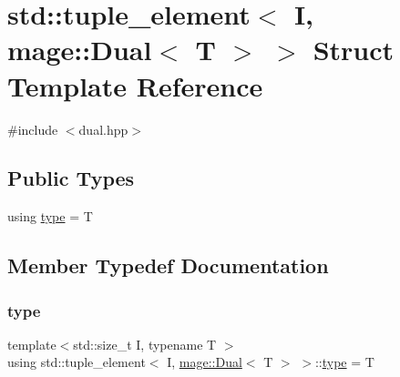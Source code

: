 \hypertarget{structstd_1_1tuple__element_3_01_i_00_01mage_1_1_dual_3_01_t_01_4_01_4}{}\section{std\+:\+:tuple\+\_\+element$<$ I, mage\+:\+:Dual$<$ T $>$ $>$ Struct Template Reference}
\label{structstd_1_1tuple__element_3_01_i_00_01mage_1_1_dual_3_01_t_01_4_01_4}


{\ttfamily \#include $<$dual.\+hpp$>$}

\subsection*{Public Types}
\begin{DoxyCompactItemize}
\item 
using \mbox{\hyperlink{structstd_1_1tuple__element_3_01_i_00_01mage_1_1_dual_3_01_t_01_4_01_4_a9d33f3a266d739dd71fb22a736c73197}{type}} = T
\end{DoxyCompactItemize}


\subsection{Member Typedef Documentation}
\mbox{\label{structstd_1_1tuple__element_3_01_i_00_01mage_1_1_dual_3_01_t_01_4_01_4_a9d33f3a266d739dd71fb22a736c73197}} 
\subsubsection{\texorpdfstring{type}{type}}
{\footnotesize\ttfamily template$<$std\+::size\+\_\+t I, typename T $>$ \\
using std\+::tuple\+\_\+element$<$ I, \mbox{\hyperlink{structmage_1_1_dual}{mage\+::\+Dual}}$<$ T $>$ $>$\+::\mbox{\hyperlink{structstd_1_1tuple__element_3_01_i_00_01mage_1_1_dual_3_01_t_01_4_01_4_a9d33f3a266d739dd71fb22a736c73197}{type}} =  T}

